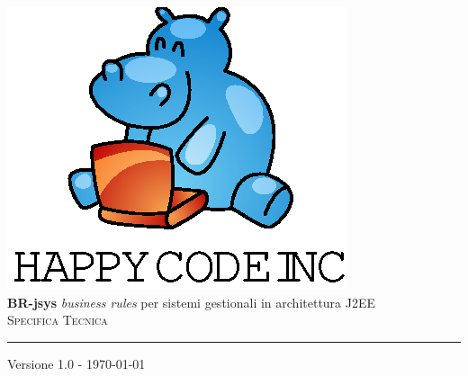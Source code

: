 \documentclass[11pt,titlepage,a4paper]{report}
\begin{document}
\newcommand{\lv}{ 1.0 } %
\newcommand{\dt}{ Specifica Tecnica }%
\newcommand{\Glossario}{ Glossario.1.4.pdf }
\newcommand{\PdQ}{ PianoDiQualifica.1.1.pdf }
\newcommand{\PdP}{ PianoDiProgetto.1.1.pdf }

\newcommand{\br}{business rule}
\newcommand{\brs}{business rules}
\newcommand{\bo}{business object}
\newcommand{\bos}{business objects}
\newcommand{\re}{repository}
\newcommand{\brp}{BusinessRuleParser}
\newcommand{\brl}{BusinessRuleLexer}
\newcommand{\BR}{BusinessRule}



\begin{titlepage}\begin{center}
\vspace*{0.5in}
\includegraphics{logo.eps}
\vspace*{0.2in} \\
{\Large \textbf{BR-jsys}}
{\Large \emph{business rules} per sistemi gestionali in architettura J2EE } 
\vspace{2in} \\
\Huge \textsc{ \dt }
\par\rule{10cm}{0.4pt} \par {\large Versione \lv - \today} \\
\end{center}\end{titlepage}
\vspace*{0.5in}
\end{document}

